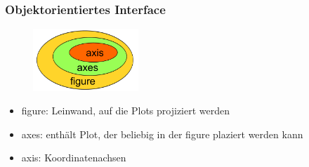 \subsubsection{Objektorientiertes Interface}
\begin{figure}[H]
  \includegraphics[width=150px]{img/matplotlib_v.png}
\end{figure}
\begin{itemize}
  \item figure: Leinwand, auf die Plots projiziert werden
  \item axes: enthält Plot, der beliebig in der figure plaziert werden kann
  \item axis: Koordinatenachsen 
\end{itemize}
